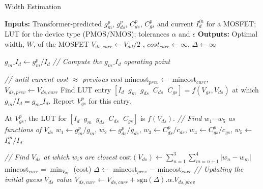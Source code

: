     \begin{algorithm}[t]
    \footnotesize
        \caption{Width Estimation}
        \label{algo:width_estimation}
    \begin{algorithmic}[1]
    \State \textbf{Inputs:} Transformer-predicted $g_{m}^p$, $g_{ds}^p$, $C_{ds}^p$, $C_{gs}^p$ and current $I_d^{in}$ for a MOSFET; LUT for the device type (PMOS/NMOS); 
    tolerances $\alpha$ and $\epsilon$ 
    \State \textbf{Outputs:} Optimal width, $W$, of the MOSFET
    \State $V_{ds,curr} \gets V_{dd}/2$ , $cost_{curr} \gets \infty$, $\Delta \gets \infty$  \label{algo2:init}
    
    \State $g_m\_I_d  \gets g_{m}^p/I_d$ \textit{// Compute the $g_m\_I_d$ operating point}
    
    \While{$|\Delta| > \epsilon$} \textit{// until current cost $\approx$ previous cost}
        \State mincost$_{prev} \gets$ mincost$_{curr}$, $V_{ds,prev} \gets V_{ds,curr}$ \label{algo2:while_begin}
        \State Find LUT entry $[I_d \;\; g_m \;\; g_{ds} \;\; C_{ds} \;\; C_{gs}] = f(V_{gs}, V_{ds})$ \label{algo2:gmId}
        \Statex \hspace*{10mm} at which $g_m/I_d = g_m\_I_d$. Report $V_{gs}^p$ for this entry.

        \State At $V_{gs}^p$, the LUT for $[I_d \;\; g_m \;\; g_{ds} \;\; C_{ds} \;\; C_{gs}]$ is $f(V_{ds})$.
        \State \textit{// Find $w_1 \cdots w_5$ as functions of $V_{ds}$}
        \State $w_1$$\gets$$g_{m}^p/g_m$, $w_2$$\gets$$g_{ds}^p/g_{ds}$, $w_3$$\gets$$C_{ds}^p/c_{ds}$, 
        \Statex \hspace*{10mm} $w_4$$\gets$$C_{gs}^p/c_{gs}$, $w_5$$\gets$$I_d^{in}/I_d$
        

        \Statex \hspace{1.3em} \textit{// Find $V_{ds}$ at which $w_i$s are closest}
        \State cost$(V_{ds}) \gets \sum_{n=1}^{3} \sum_{m=n+1}^{4} |w_n - w_m|$   \label{algo2:wcalc_begin}
        \State mincost$_{curr} = \min_{V_{ds}}$ (cost)
        \State $\Delta \gets$ mincost$_{prev}$ $-$ mincost$_{curr}$ \label{algo2:wcalc_end}
        \Statex \hspace{1.3em} \textit{// Updating the initial guess $V_{ds}$ value}
        \State $V_{ds,curr} \gets V_{ds,curr} + \mbox{sgn}(\Delta).\alpha.V_{ds, prev}$ \label{algo2:while_end}
        

\end{algorithmic}
\end{algorithm}
